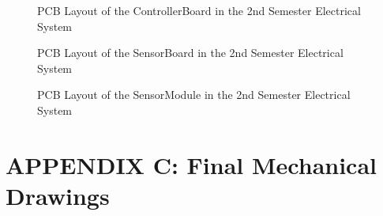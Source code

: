     \begin{figure}[H]
      \begin{center}
        \caption{PCB Layout of the ControllerBoard in the 2nd Semester Electrical System}
        \label{fig:ControllerBoardV2PCB}
      \end{center}
    \end{figure}

    \begin{figure}[H]
      \begin{center}
        \caption{PCB Layout of the SensorBoard in the 2nd Semester Electrical System}
        \label{fig:LineSensorBoardPCBRev2}
      \end{center}
    \end{figure}

    \begin{figure}[H]
      \begin{center}
        \caption{PCB Layout of the SensorModule in the 2nd Semester Electrical System}
        \label{fig:SensorModulePCB}
      \end{center}
    \end{figure}


\clearpage
\section{APPENDIX C: Final Mechanical Drawings}
\label{sec:APPENDIX C: Final Mechanical Drawings}







